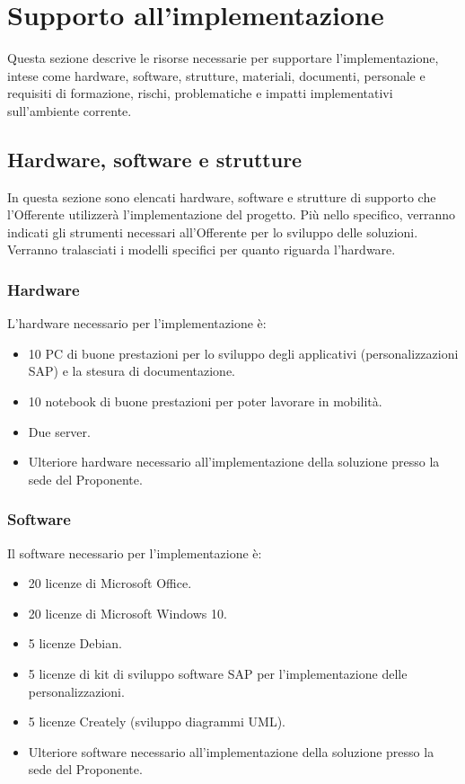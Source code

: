 \newpage

	\section{Supporto all'implementazione}
    	Questa sezione descrive le risorse necessarie per supportare l'implementazione, intese come hardware, software, strutture, materiali, documenti, personale e requisiti di formazione, rischi, problematiche e impatti implementativi sull'ambiente corrente.
        
        \subsection{Hardware, software e strutture}
			In questa sezione sono elencati hardware, software e strutture di supporto che l'Offerente utilizzerà l'implementazione del progetto. Più nello specifico, verranno indicati gli strumenti necessari all'Offerente per lo sviluppo delle soluzioni. Verranno tralasciati i modelli specifici per quanto riguarda l'hardware.
            \subsubsection{Hardware}
            	L'hardware necessario per l'implementazione è:
                \begin{itemize}
                	\item 10 PC di buone prestazioni per lo sviluppo degli applicativi (personalizzazioni SAP) e la stesura di documentazione.
                    \item 10 notebook di buone prestazioni per poter lavorare in mobilità.
                    \item Due server.   
                    \item Ulteriore hardware necessario all'implementazione della soluzione presso la sede del Proponente.
                \end{itemize}
                
            \subsubsection{Software}
            	Il software necessario per l'implementazione è:
            		\begin{itemize}
            			\item 20 licenze di Microsoft Office.
                        \item 20 licenze di Microsoft Windows 10.
                        \item 5 licenze Debian.
                        \item 5 licenze di kit di sviluppo software SAP per l'implementazione delle personalizzazioni.
                        \item 5 licenze Creately (sviluppo diagrammi UML).
                        \item Ulteriore software necessario all'implementazione della soluzione presso la sede del Proponente.
            		\end{itemize}
                    
